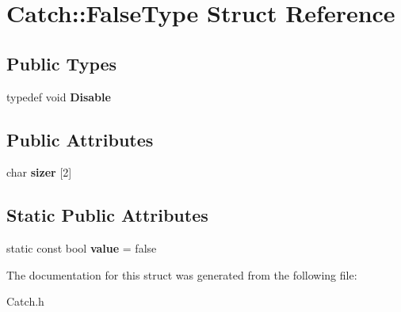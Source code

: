 \hypertarget{struct_catch_1_1_false_type}{\section{Catch\-:\-:False\-Type Struct Reference}
\label{struct_catch_1_1_false_type}
}
\subsection*{Public Types}
\begin{DoxyCompactItemize}
\item 
\hypertarget{struct_catch_1_1_false_type_a9b1d652f081c774bdaea5d061bb3372c}{typedef void {\bfseries Disable}}\label{struct_catch_1_1_false_type_a9b1d652f081c774bdaea5d061bb3372c}

\end{DoxyCompactItemize}
\subsection*{Public Attributes}
\begin{DoxyCompactItemize}
\item 
\hypertarget{struct_catch_1_1_false_type_ad0a0468edb767e93e12459b816a89a88}{char {\bfseries sizer} \mbox{[}2\mbox{]}}\label{struct_catch_1_1_false_type_ad0a0468edb767e93e12459b816a89a88}

\end{DoxyCompactItemize}
\subsection*{Static Public Attributes}
\begin{DoxyCompactItemize}
\item 
\hypertarget{struct_catch_1_1_false_type_a34974ab2e06c898a360ba5f3b2d9ebe3}{static const bool {\bfseries value} = false}\label{struct_catch_1_1_false_type_a34974ab2e06c898a360ba5f3b2d9ebe3}

\end{DoxyCompactItemize}


The documentation for this struct was generated from the following file\-:\begin{DoxyCompactItemize}
\item 
Catch.\-h\end{DoxyCompactItemize}
